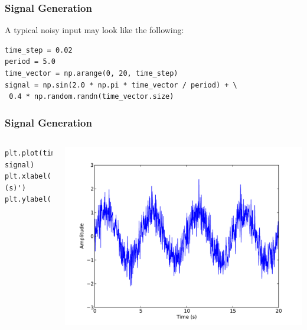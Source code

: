 \documentclass[10pt,colorlinks]{beamer}
\begin{document}
\begin{frame}[fragile]\frametitle{Signal Generation}
  \begin{block}{}
  A typical noisy input may look like the following:
 \end{block}

\begin{verbatim}
time_step = 0.02
period = 5.0
time_vector = np.arange(0, 20, time_step)
signal = np.sin(2.0 * np.pi * time_vector / period) + \
 0.4 * np.random.randn(time_vector.size)
\end{verbatim}

\end{frame}



\begin{frame}[fragile]\frametitle{Signal Generation}

\begin{columns}[c]
\begin{verbatim}
plt.plot(time_vector, signal)
plt.xlabel('Time (s)')
plt.ylabel('Amplitude')
\end{verbatim}

\includegraphics[width=\textwidth]{plwfigis/CursP_3_fft2}

\end{columns}
\end{frame}
\end{document}
